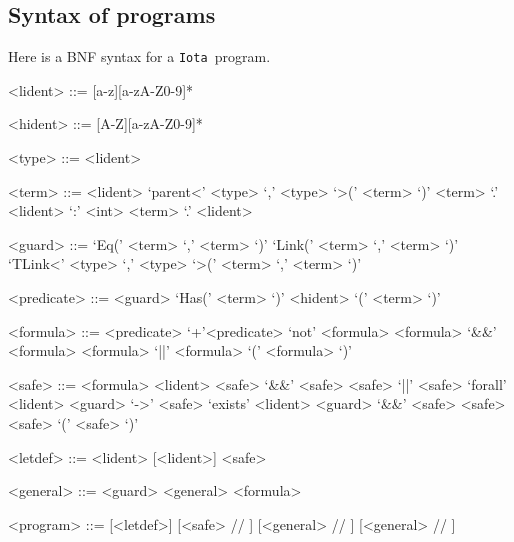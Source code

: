 \documentclass[10pt,a4paper]{article}
\newcommand{\Iota}{\texttt{Iota }}
\begin{document}
\subsection{Syntax of programs}
\label{subsec:syntaxprog} Here is a BNF syntax for a \Iota program.
\begin{grammar}
  <lident> ::= [a-z][a-zA-Z0-9]*

  <hident> ::= [A-Z][a-zA-Z0-9]*

  <type> ::= <lident>

  <term> ::= <lident>
  \alt `parent<' <type> `,' <type> `>(' <term> `)'
  \alt <term> `.' <lident> `:' <int>
  \alt <term> `.' <lident>

  <guard> ::= `Eq(' <term> `,' <term> `)'
  \alt `Link(' <term> `,' <term> `)'
  \alt `TLink<' <type> `,' <type> `>(' <term> `,' <term> `)'

  <predicate> ::= <guard>
  \alt `Has(' <term> `)'
  \alt <hident> `(' <term> `)'

  <formula> ::= <predicate>
  \alt `+'<predicate>
  \alt `not' <formula>
  \alt <formula> `&&' <formula>
  \alt <formula> `||' <formula>
  \alt `(' <formula> `)'

  <safe> ::= <formula>
  \alt <lident>
  \alt <safe> `&&' <safe>
  \alt <safe> `||' <safe>
  \alt `forall' <lident> <guard> `->' <safe>
  \alt `exists' <lident> <guard> `&&' <safe>
  \alt <safe> <safe>
  \alt `(' <safe> `)'

  <letdef> ::=  <lident> [<lident>] \lit{=} <safe>

  <general> ::=
  <guard> \lit{->} <general>
  \alt \lit{=>} <formula>

  <program> ::=
  [<letdef>]  [<safe> // \lit{;}]  [<general> // \lit{;}]  [<general> // \lit{;}]

\end{grammar}



\end{document}
